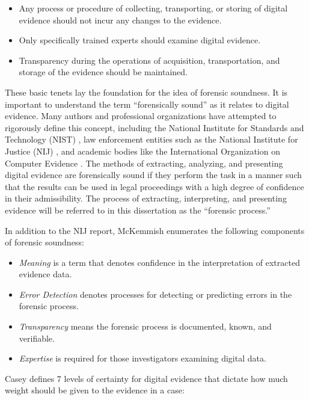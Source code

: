 \begin{itemize}
\item Any process or procedure of collecting, transporting, or storing of digital evidence should not incur any changes to the evidence.
\item Only specifically trained experts should examine digital evidence.
\item Transparency during the operations of acquisition, transportation, and storage of the evidence should be maintained.
\end{itemize}

These basic tenets lay the foundation for the idea of forensic soundness. It is important to understand the term “forensically sound” 
as it relates to digital evidence. Many authors and professional organizations have attempted to rigorously define this concept, 
including the National Institute for Standards and Technology (NIST) \cite{NIST2001}, law enforcement entities such as the National Institute for 
Justice (NIJ) \cite{NIJ2008}, and academic bodies like the International Organization on Computer Evidence \cite{IOCE2002}. The methods of extracting, analyzing, 
and presenting digital evidence are forensically sound if they perform the task in a manner such that the results can be used in legal 
proceedings with a high degree of confidence in their admissibility. The process of extracting, interpreting, and presenting evidence 
will be referred to in this dissertation as the “forensic process.”

In addition to the NIJ report, McKemmish \cite{mckemmish2008} enumerates the following components of forensic soundness:

\begin{itemize}
\item \emph{Meaning} is a term that denotes confidence in the interpretation of extracted evidence data.
\item \emph{Error Detection} denotes processes for detecting or predicting errors in the forensic process.
\item \emph{Transparency} means the forensic process is documented, known, and verifiable.
\item \emph{Expertise} is required for those investigators examining digital data.
\end{itemize}

Casey \cite{casey2002} defines 7 levels of certainty for digital evidence that dictate how much weight should be given to the evidence in a case:

